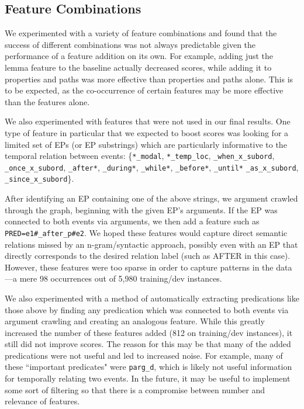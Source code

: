 \documentclass[11pt]{article}
\begin{document}
\subsection{Feature Combinations}

We experimented with a variety of feature combinations and found that the success of different combinations was not always predictable given the performance of a feature addition on its own. For example, adding just the lemma feature to the baseline actually decreased scores, while adding it to properties and paths was more effective than properties and paths alone. This is to be expected, as the co-occurrence of certain features may be more effective than the features alone.

We also experimented with features that were not used in our final results. One type of feature in particular that we expected to boost scores was looking for a limited set of EPs (or EP substrings) which are particularly informative to the temporal relation between events: \{\texttt{*\_modal}, \texttt{*\_temp\_loc}, \texttt{\_when\_x\_subord}, \texttt{\_once\_x\_subord}, \texttt{\_after*}, \texttt{\_during*}, \texttt{\_while*}, \texttt{\_before*}, \texttt{\_until*} \texttt{\_as\_x\_subord}, \texttt{\_since\_x\_subord}\}.

After identifying an EP containing one of the above strings, we argument crawled through the graph, beginning with the given EP's arguments. If the  EP was connected to both events via arguments, we then add a feature such as \texttt{PRED=e1\#\_after\_p\#e2}. We hoped these features would capture direct semantic relations missed by an n-gram/syntactic approach, possibly even with an EP that directly corresponds to the desired relation label (such as AFTER in this case). However, these features were too sparse in order to capture patterns in the data---a mere 98 occurrences out of 5,980 training/dev instances.

We also experimented with a method of automatically extracting predications like those above by finding any predication which was connected to both events via argument crawling and creating an analogous feature. While this greatly increased the number of these features added (812 on training/dev instances), it still did not improve scores. The reason for this may be that many of the added predications were not useful and led to increased noise. For example, many of these ``important predicates" were \texttt{parg\_d}, which is likely not useful information for temporally relating two events. In the future, it may be useful to implement some sort of filtering so that there is a compromise between number and relevance of features.
\end{document}
